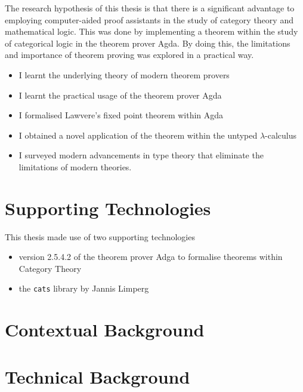 \documentclass[ %
                author={Alessio Zakaria},
                supervisor={Dr. Nicolas Wu},
                degree={MEng},
                title={Automated Theorem Proving in Category Theory and the
                $\lambda$-calculus},
                subtitle={},
                type={Research},
                year={2019} ]{dissertation}
\begin{document}
The research hypothesis of this thesis is that there is a significant advantage
to employing computer-aided proof assistants in the study of category theory and
mathematical logic. This was done by implementing a theorem within the study of
categorical logic in the theorem prover Agda. By doing this, the limitations and
importance of theorem proving was explored in a practical way.

\begin{itemize}
    \item I learnt the underlying theory of modern theorem provers
    \item I learnt the practical usage of the theorem prover Agda
    \item I formalised Lawvere's fixed point theorem within Agda
    \item I obtained a novel application of the theorem within the untyped
        $\lambda$-calculus
    \item I surveyed modern advancements in type theory that eliminate the
        limitations of modern theories.
\end{itemize}

\chapter*{Supporting Technologies}

This thesis made use of two supporting technologies

\begin{itemize}
    \item version 2.5.4.2 of the theorem prover Adga to formalise theorems
        within Category Theory
    \item the \verb|cats| library by Jannis Limperg \cite{limperg2019cats}
\end{itemize}
\chapter{Contextual Background}
\label{chap:context}






\chapter{Technical Background}
\label{chap:technical}
\end{document}
